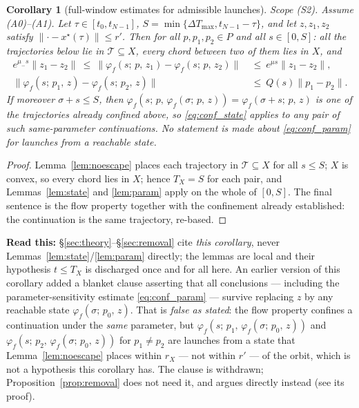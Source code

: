 \documentclass[11pt]{article}
\newtheorem{corollary}{Corollary}
\theoremstyle{remark}\newtheorem{remark}{Remark}
\newcommand{\norm}[1]{\lVert #1\rVert}
\newcommand{\flow}[3]{\varphi_f(#1;\,#2,\,#3)}
\newcommand{\readthis}[1]{\textbf{Read this:} #1}
\begin{document}
\begin{corollary}[full-window estimates for admissible launches]\label{cor:confined}
\emph{Scope (S2).} Assume (A0)--(A1). Let $\tau\in[t_0,t_{N-1}]$, $S=\min\{\Delta T_{\max},t_{N-1}-\tau\}$, and let $z,z_1,z_2$ satisfy $\norm{\cdot-x^\star(\tau)}\le r'$. Then for all $p,p_1,p_2\in P$ and all $s\in[0,S]$: all the trajectories below lie in $\mathcal T\subseteq X$, every chord between two of them lies in $X$, and
\begin{align}
e^{\mu_- s}\norm{z_1-z_2}\ \le\ \norm{\flow{s}{p}{z_1}-\flow{s}{p}{z_2}}\ &\le\ e^{\mu s}\norm{z_1-z_2},
\label{eq:conf_state}\\
\norm{\flow{s}{p_1}{z}-\flow{s}{p_2}{z}}\ &\le\ Q(s)\norm{p_1-p_2}.
\label{eq:conf_param}
\end{align}
If moreover $\sigma+s\le S$, then $\flow{s}{p}{\flow{\sigma}{p}{z}}=\flow{\sigma+s}{p}{z}$ is one of the trajectories already confined above, so \eqref{eq:conf_state} applies to any \emph{pair} of such same-parameter continuations. No statement is made about \eqref{eq:conf_param} for launches from a reachable state.
\end{corollary}
\begin{proof}
Lemma~\ref{lem:noescape} places each trajectory in $\mathcal T\subseteq X$ for all $s\le S$; $X$ is convex, so every chord lies in $X$; hence $T_X=S$ for each pair, and Lemmas~\ref{lem:state} and \ref{lem:param} apply on the whole of $[0,S]$. The final sentence is the flow property together with the confinement already established: the continuation is the same trajectory, re-based.
\end{proof}
\readthis{\S\ref{sec:theory}--\S\ref{sec:removal} cite \emph{this corollary}, never Lemmas~\ref{lem:state}/\ref{lem:param} directly; the lemmas are local and their hypothesis $t\le T_X$ is discharged once and for all here. An earlier version of this corollary added a blanket clause asserting that all conclusions --- including the parameter-sensitivity estimate \eqref{eq:conf_param} --- survive replacing $z$ by any reachable state $\flow{\sigma}{p_0}{z}$. That is \emph{false as stated}: the flow property confines a continuation under the \emph{same} parameter, but $\flow{s}{p_1}{\flow{\sigma}{p_0}{z}}$ and $\flow{s}{p_2}{\flow{\sigma}{p_0}{z}}$ for $p_1\ne p_2$ are launches from a state that Lemma~\ref{lem:noescape} places within $r_X$ --- not within $r'$ --- of the orbit, which is not a hypothesis this corollary has. The clause is withdrawn; Proposition~\ref{prop:removal} does not need it, and argues directly instead (see its proof).}
\end{document}
